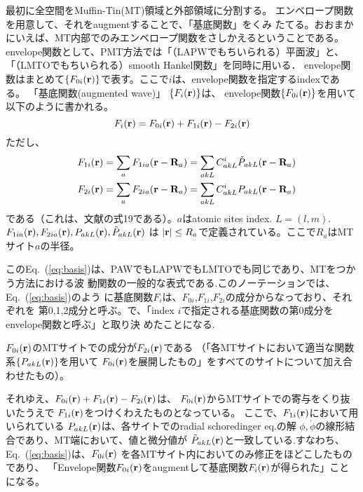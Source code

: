 \documentclass[twocolumn,showpacs,preprintnumbers,amsmath,amssymb,floatfix]{revtex4-1}
\newcommand{\bfr}{{\bf r}}
\newcommand{\bfR}{{\bf R}}
\def\phidot{\dot{\phi}}
\newcommand{\req}[1]{\mbox{Eq.~\!(\ref{#1})}}
\begin{document}
最初に全空間をMuffin-Tin(MT)領域と外部領域に分割する。
エンベロープ関数を用意して、それをaugmentすることで、「基底関数」をくみ
たてる。おおまかにいえば、MT内部でのみエンベロープ関数をさしかえるということである。
envelope関数として、PMT方法では「（LAPWでもちいられる）平面波」と、
「（LMTOでもちいられる）smooth Hankel関数」を同時に用いる．
envelope関数はまとめて$\{{F}_{0i}(\bfr)\}$で表す。ここで$i$は、envelope関数を指定するindexである。
「基底関数(augmented wave)」 $\{{F}_i(\bfr)\}$は、
envelope関数$\{F_{0i}(\bfr)\}$を用いて以下のように書かれる。　　
\begin{equation}
F_i(\bfr) = F_{0i}(\bfr) + F_{1i}(\bfr)-F_{2i}(\bfr) \label{eq:basis} \\
\end{equation}
ただし、
\begin{eqnarray}
&&F_{1i}(\bfr)=\sum_a F_{1ia}(\bfr-\bfR_a)= \sum_{akL} C^{i}_{akL} \tilde{P}_{akL}(\bfr-\bfR_a) \\ 
&&F_{2i}(\bfr)=\sum_a F_{2ia}(\bfr-\bfR_a)= \sum_{akL} C^{i}_{akL} {P}_{akL}(\bfr-\bfR_a)  
\end{eqnarray}
である（これは、文献\cite{lmfchap}の式19である）。$a$はatomic sites
index. $L=(l,m)$.$F_{1ia}(\bfr),F_{2ia}(\bfr),P_{akL} (\bfr),\tilde{P}_{akL} (\bfr)$ は 
$|\bfr| \le R_a$で定義されている。ここで$R_a$はMTサイト$a$の半径。
 
この\req{eq:basis}は、PAWでもLAPWでもLMTOでも同じであり、MTをつかう方法における波
動関数の一般的な表式である.このノーテーションでは、\req{eq:basis}のよう
に基底関数$F_i$は、$F_{0i}$,$F_{1i}$,$F_{2i}$の成分からなっており、それぞれを
第0,1,2成分と呼ぶ。で、「index $i$で指定される基底関数の第0成分をenvelope関数と呼ぶ」と取り決
めたことになる.

$F_{0i}(\bfr)$のMTサイトでの成分が$F_{2i}(\bfr)$である
（「各MTサイトにおいて適当な関数系$\{{P}_{akL}(\bfr)\}$を用いて
$F_{0i}(\bfr)$を展開したもの」をすべてのサイトについて加え合わせたもの）。

それゆえ、$F_{0i}(\bfr)+F_{1i}(\bfr)-F_{2i}(\bfr)$は、
$F_{0i}(\bfr)$からMTサイトでの寄与をくり抜いたうえで
$F_{1i}(\bfr)$をつけくわえたものとなっている。
ここで、$F_{1i}(\bfr)$において用いられている
${P}_{akL}(\bfr)$は、各サイトでのradial schoredinger eq.の解
$\phi,\phidot$の線形結合であり、MT端において、値と微分値が
$\tilde{P}_{akL}(\bfr)$と一致している.すなわち、
\req{eq:basis}は、$F_{0i}(\bfr)$
を各MTサイト内においてのみ修正をほどこしたものであり、
「Envelope関数$F_{0i}(\bfr)$をaugmentして基底関数$F_i(\bfr)$が得られた」ことになる。
\end{document}
